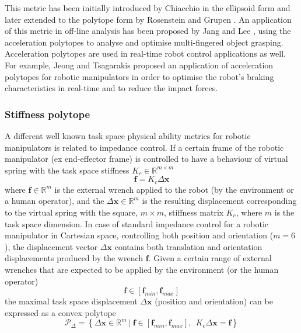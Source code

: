 This metric has been initially introduced by Chiacchio \cite{chiacchio_2000} in the ellipsoid form and later extended to the polytope form by  Rosenstein and Grupen \cite{rosenstein2002velocity}. An application of this metric in off-line analysis has been proposed by Jang and Lee \cite{Jang2009}, using the acceleration polytopes to analyse and optimise multi-fingered object grasping. Acceleration polytopes are used in real-time robot control applications as well. For example, Jeong and Tsagarakis \cite{jeong2006optimal} proposed an application of acceleration polytopes for robotic manipulators in order to optimise the robot's braking characteristics in real-time and to reduce the impact forces. 

\subsubsection{Stiffness polytope}
\label{ch:robot_stiffness_poly}
A different well known task space physical ability metrics for robotic manipulators is related to impedance control. If a certain frame of the robotic manipulator (ex end-effector frame) is controlled to have a behaviour of virtual spring with the task space stiffness $K_c \in \mathbb{R}^{m\times m}$
\begin{equation}
    \bm{f} = K_c \Delta\bm{x}
\end{equation}
where $\bm{f}\in\mathbb{R}^m$ is the  external wrench applied to the robot (by the environment or a human operator), and the $\Delta \bm{x}\in\mathbb{R}^m$ is the resulting displacement corresponding to the virtual spring with the square, $m\times m$, stiffness matrix $K_c$, where $m$ is the task space dimension.  In case of standard impedance control for a robotic manipulator in Cartesian space, controlling both position and orientation ($m=6$), the displacement vector $\Delta \bm{x}$ contains both translation and orientation displacements produced by the wrench $\bm{f}$.
Given a certain range of external wrenches that are expected to be applied by the environment (or the human operator) 
\begin{equation}
    \bm{f}\in\left[\bm{f}_{min}, \bm{f}_{max} \right]
    \label{eq:force_stiff_range}
\end{equation}
the maximal task space displacement $\Delta \bm{x}$ (position and orientation) can be expressed as a convex polytope 
\begin{equation}
    \mathcal{P}_\Delta = \left\{ \Delta\bm{x} \in \mathbb{R}^m ~|~ \bm{f}\in\left[\bm{f}_{min}, \bm{f}_{max} \right], ~~ K_c\Delta\bm{x} = \bm{f} \right\}
\end{equation}

